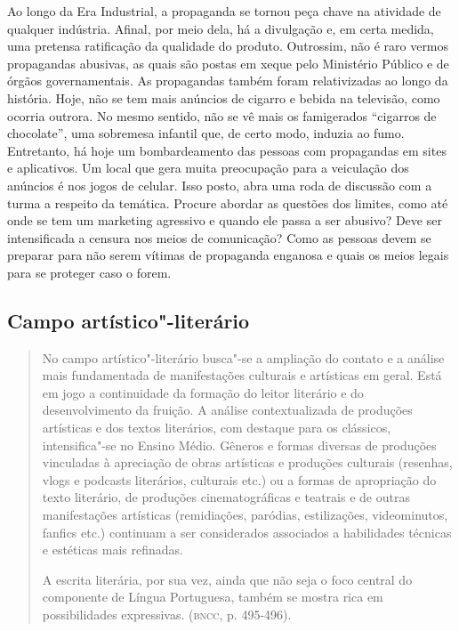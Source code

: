 \documentclass[12pt]{extarticle}
\begin{document}
Ao longo da Era Industrial, a propaganda se tornou peça chave na
atividade de qualquer indústria. Afinal, por meio dela, há a
divulgação e, em certa medida, uma pretensa ratificação da qualidade
do produto. Outrossim, não é raro vermos propagandas abusivas, as
quais são postas em xeque pelo Ministério Público e de órgãos
governamentais. As propagandas também foram relativizadas ao longo da
história. Hoje, não se tem mais anúncios de cigarro e bebida na
televisão, como ocorria outrora. No mesmo sentido, não se vê mais os
famigerados ``cigarros de chocolate'', uma sobremesa infantil que, de
certo modo, induzia ao fumo. Entretanto, há hoje um bombardeamento das
pessoas com propagandas em sites e aplicativos. Um local que gera
muita preocupação para a veiculação dos anúncios é nos jogos de
celular. Isso posto, abra uma roda de discussão com a turma a respeito
da temática. Procure abordar as questões dos limites, como até onde se
tem um marketing agressivo e quando ele passa a ser abusivo? Deve ser
intensificada a censura nos meios de comunicação? Como as pessoas
devem se preparar para não serem vítimas de propaganda enganosa e
quais os meios legais para se proteger caso o forem.

\subsection{Campo artístico"-literário}

\begin{quote}
No campo artístico"-literário busca"-se a ampliação do contato e a
análise mais fundamentada de manifestações culturais e artísticas em
geral. Está em jogo a continuidade da formação do leitor literário e do
desenvolvimento da fruição. A análise contextualizada de produções
artísticas e dos textos literários, com destaque para os clássicos,
intensifica"-se no Ensino Médio. Gêneros e formas diversas de produções
vinculadas à apreciação de obras artísticas e produções culturais
(resenhas, vlogs e podcasts literários, culturais etc.) ou a formas de
apropriação do texto literário, de produções cinematográficas e teatrais
e de outras manifestações artísticas (remidiações, paródias,
estilizações, videominutos, fanfics etc.) continuam a ser considerados
associados a habilidades técnicas e estéticas mais refinadas.

A escrita literária, por sua vez, ainda que não seja o foco central do
componente de Língua Portuguesa, também se mostra rica em possibilidades
expressivas. (\textsc{bncc}, p. 495-496).
\end{quote}
\end{document}
